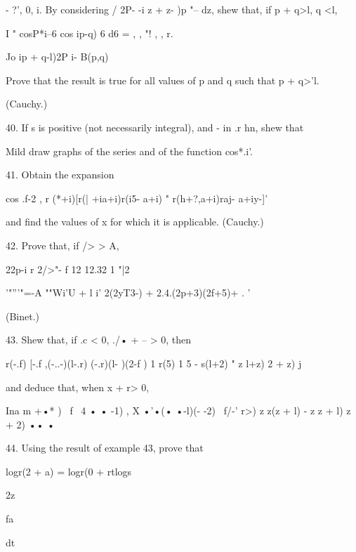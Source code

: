 - ?', 0, i. By considering / 2P- -i z + z- )p "-- dz, shew that, if p
+ q>l, q <l,

I " cosP*i--6 cos ip-q) 6 d6 = , , "! , , r.

Jo ip + q-l)2P i- B(p,q)

Prove that the result is true for all values of p and q such that p +
q>'l.

(Cauchy.)

40. If s is positive (not necessarily integral), and - in .r hn, shew
that

Mild draw graphs of the series and of the function cos*.i'.

41. Obtain the expansion

cos .f-2 , r (*+i)[r(| +ia+i)r(i5- a+i) " r(h+?,a+i)raj- a+iy-]'

and find the values of x for which it is applicable. (Cauchy.)

42. Prove that, if /> > A,

22p-i r 2/>"- f 12 12.32 1 "|2

'"'''"=-A ""Wi'U + l i' 2(2yT3-) + 2.4.(2p+3)(2f+5)+ . '

(Binet.)

43. Shew that, if .c < 0, ./• + -- > 0, then

r(-.f) [-.f ,(-..-)(l-.r) (-.r)(l- )(2-f ) 1 r(5) 1 5 - s(l+2) " z
l+z) 2 + z) j

and deduce that, when x + r> 0,

  Ina m +•* ) \ f \ 4 • • -1) , X •'•(• •-l)(- -2) \ f/-' r>) z z(z +
l) - z z + l) z + 2) •• •

44. Using the result of example 43, prove that



logr(2 + a) = logr(0 + rtlogs



2z

fa

dt



